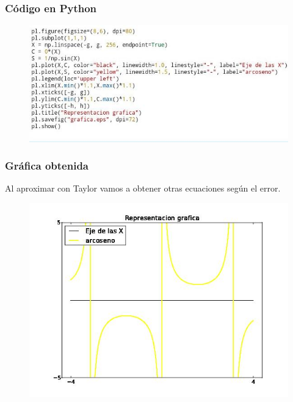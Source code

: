 \documentclass{beamer}
\begin{document}
\begin{frame}
\frametitle{Código en \textsf{Python}}

\begin{figure}[b]
\begin{center}
\includegraphics[scale=0.75]{py3.jpeg}
\end{center}
\end{figure}

\end{frame}


\begin{frame}
\frametitle{Gráfica obtenida}

\begin{block}{}
Al aproximar con Taylor vamos a obtener otras ecuaciones según el error.
\end{block}

\begin{figure}[b]
\begin{center}
\includegraphics[scale=0.5]{grafica.jpeg}
\end{center}
\end{figure}

\end{frame}
\end{document}
